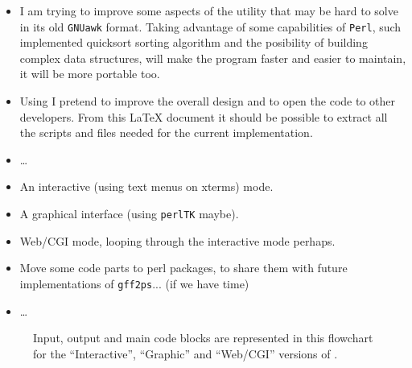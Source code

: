 \documentclass[11pt]{article}
\let\nwdocspar=\par                    %
\begin{document}

\begin{itemize}
\item I am trying to improve some aspects of the {\prog} utility that may be hard to solve in its old \texttt{GNUawk} format. Taking advantage of some capabilities of \texttt{Perl}, such implemented quicksort sorting algorithm and the posibility of building complex data structures, will make the program faster and easier to maintain, it will be more portable too. 

\item Using {\noweb} I pretend to improve the overall design and to open the code to other developers. From this {\LaTeX} document it should be possible to extract all the scripts and files needed for the current implementation.

\item \ldots 
\end{itemize}


\begin{itemize}
\item An interactive (using text menus on xterms) mode.

\item A graphical interface (using {\tt{}perlTK} maybe).

\item Web/CGI mode, looping through the interactive mode perhaps.

\item Move some code parts to perl packages, to share them with future implementations of {\tt{}gff2ps}... (if we have time)

\item \ldots
\end{itemize}

\label{todo:AAB}
\nwenddocs{}%
%
\nwdocspar
\nwenddocs{}%
%
\nwdocspar
\todo{ \item \todoAAB } %

\begin{figure}[!ht]
\begin{center}
\fbox{\parbox[c][8cm][c]{\linewidth}{\hfill}}
\caption[Future modes of {\prog}.]{\label{fig:othermodes} Input, output and main code blocks are represented in this flowchart for the ``Interactive'', ``Graphic'' and ``Web/CGI'' versions of {\prog}.}
\end{center}
\end{figure}
\end{document}
